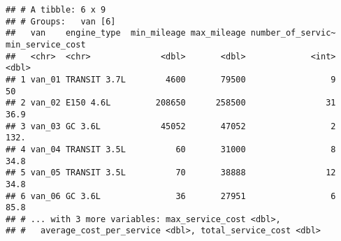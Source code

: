 \documentclass[
]{article}
\begin{document}
\begin{verbatim}
## # A tibble: 6 x 9
## # Groups:   van [6]
##   van    engine_type  min_mileage max_mileage number_of_servic~ min_service_cost
##   <chr>  <chr>              <dbl>       <dbl>             <int>            <dbl>
## 1 van_01 TRANSIT 3.7L        4600       79500                 9             50  
## 2 van_02 E150 4.6L         208650      258500                31             36.9
## 3 van_03 GC 3.6L            45052       47052                 2            132. 
## 4 van_04 TRANSIT 3.5L          60       31000                 8             34.8
## 5 van_05 TRANSIT 3.5L          70       38888                12             34.8
## 6 van_06 GC 3.6L               36       27951                 6             85.8
## # ... with 3 more variables: max_service_cost <dbl>,
## #   average_cost_per_service <dbl>, total_service_cost <dbl>
\end{verbatim}
\end{document}
